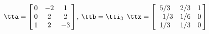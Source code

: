 {$\tta = \left[\hskip -3pt \begin{array}{ccc} 0&-2&1 \\    0&2&2 \\    1&2&-3\end{array}\hskip -3pt \right] $, 
 \quad
$\ttb=\tti_3 $}
{$\ttx=\left[\hskip -3pt \begin{array}{ccc} 5/3&2/3&1\\    -1/3 &1/6&0\\    1/3&1/3&0  \end{array}\hskip -3pt \right] $}
